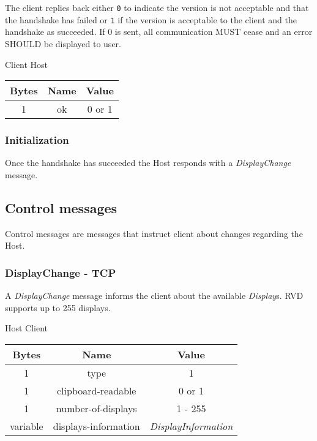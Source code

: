 \documentclass{article}
\begin{document}
    The client replies back either \texttt{0} to indicate the version is not acceptable and that the handshake has failed or \texttt{1} if the version is acceptable to the client and the handshake as succeeded. If 0 is sent, all communication MUST cease and an error SHOULD be displayed to user.

    \begin{center}
        Client \textrightarrow Host\\
        \begin{tabular}{|c|c|c|}
            \hline
            \textbf{Bytes} & \textbf{Name} & \textbf{Value} \\
            \hline
            1              & ok            & 0 or 1         \\
            \hline
        \end{tabular}
    \end{center}

    \subsubsection{Initialization}

    Once the handshake has succeeded the Host responds with a \emph{DisplayChange} message.

    \subsection{Control messages}
    Control messages are messages that instruct client about changes regarding the Host.

    \subsubsection{DisplayChange - TCP}
    A \emph{DisplayChange} message informs the client about the available \emph{Display}s. RVD supports up to 255 displays.

    \begin{center}
        Host \textrightarrow Client\\
        \begin{tabular}{|c|c|c|}
            \hline
            \textbf{Bytes} & \textbf{Name}        & \textbf{Value}            \\
            \hline
            1              & type                 & 1                         \\
            \hline
            1              & clipboard-readable   & 0 or 1                    \\
            \hline
            1              & number-of-displays   & 1 - 255                   \\
            \hline
            variable       & displays-information & \emph{DisplayInformation} \\
            \hline
        \end{tabular}
    \end{center}
\end{document}

